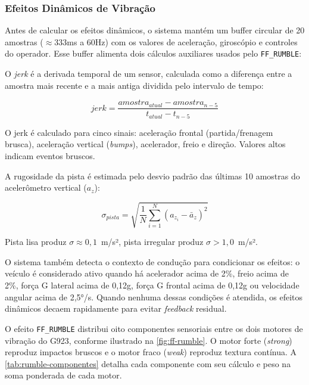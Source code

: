 \subsubsection{Efeitos Dinâmicos de Vibração}

Antes de calcular os efeitos dinâmicos, o sistema mantém um buffer circular de 20 amostras ($\approx$333ms a 60Hz) com os valores de aceleração, giroscópio e controles do operador. Esse buffer alimenta dois cálculos auxiliares usados pelo \texttt{FF\_RUMBLE}:

O \textit{jerk} é a derivada temporal de um sensor, calculada como a diferença entre a amostra mais recente e a mais antiga dividida pelo intervalo de tempo:

\begin{equation}
\label{eq:jerk}
jerk = \frac{amostra_{atual} - amostra_{n-5}}{t_{atual} - t_{n-5}}
\end{equation}

\noindent O jerk é calculado para cinco sinais: aceleração frontal (partida/frenagem brusca), aceleração vertical (\textit{bumps}), acelerador, freio e direção. Valores altos indicam eventos bruscos.

A rugosidade da pista é estimada pelo desvio padrão das últimas 10 amostras do acelerômetro vertical ($a_z$):

\begin{equation}
\label{eq:rugosidade}
\sigma_{pista} = \sqrt{\frac{1}{N}\sum_{i=1}^{N}(a_{z_i} - \bar{a}_z)^2}
\end{equation}

\noindent Pista lisa produz $\sigma \approx 0{,}1$~m/s², pista irregular produz $\sigma > 1{,}0$~m/s².

O sistema também detecta o contexto de condução para condicionar os efeitos: o veículo é considerado ativo quando há acelerador acima de 2\%, freio acima de 2\%, força G lateral acima de 0,12g, força G frontal acima de 0,12g ou velocidade angular acima de 2,5°/s. Quando nenhuma dessas condições é atendida, os efeitos dinâmicos decaem rapidamente para evitar \textit{feedback} residual.

O efeito \texttt{FF\_RUMBLE} distribui oito componentes sensoriais entre os dois motores de vibração do G923, conforme ilustrado na \autoref{fig:ff-rumble}. O motor forte (\textit{strong}) reproduz impactos bruscos e o motor fraco (\textit{weak}) reproduz textura contínua. A \autoref{tab:rumble-componentes} detalha cada componente com seu cálculo e peso na soma ponderada de cada motor.

